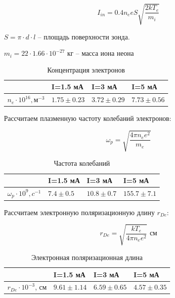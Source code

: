 \documentclass[a4paper, 12pt]{article}
\begin{document}
\[I_{in} = 0.4n_eeS\sqrt{\frac{2kT_e}{m_i}}\]

$S = \pi \cdot d \cdot l$ -- площадь поверхности зонда.

$m_i = 22 \cdot 1.66 \cdot 10^{-27}$ кг -- масса иона неона

\begin{table}[h!]
\caption{Концентрация электронов}
\begin{center}
\begin{tabular}{|l|l|l|l|}
\hline
    & I=1.5 мА & I=3 мА & I=5 мА \\ \hline
$n_e \cdot 10^{16}, \text{м}^{-3}$ & $1.75 \pm 0.23$  & $3.72 \pm 0.29$ & $7.73 \pm 0.56$  \\ \hline
\end{tabular}
\end{center}
\label{n_e}
\end{table}

Рассчитаем плазменную частоту колебаний электронов:

\[\omega_p = \sqrt{\frac{4\pi n_ee^2}{m_e}}\]

\begin{table}[h!]
\caption{Частота колебаний}
\begin{center}
\begin{tabular}{|l|l|l|l|}
\hline
    & I=1.5 мА & I=3 мА & I=5 мА \\ \hline
$\omega_p \cdot 10^9, c^{-1}$ & $7.4 \pm 0.5$  & $10.8 \pm 0.7$ & $155.7 \pm 7.1$  \\ \hline
\end{tabular}
\end{center}
\label{w_p}
\end{table}

Рассчитаем электронную поляризационную длину $r_{De}$:

\[r_{De} = \sqrt{\frac{kT_e}{4\pi n_ee^2}}\text{ см}\]

\begin{table}[h!]
\caption{Электронная поляризационная длина}
\begin{center}
\begin{tabular}{|l|l|l|l|}
\hline
    & I=1.5 мА & I=3 мА & I=5 мА \\ \hline
$r_{De} \cdot 10^{-3}$, см & $9.61 \pm 1.14$  & $6.59 \pm 0.65$ & $4.57 \pm 0.35$  \\ \hline
\end{tabular}
\end{center}
\label{r_De}
\end{table}
\end{document}
